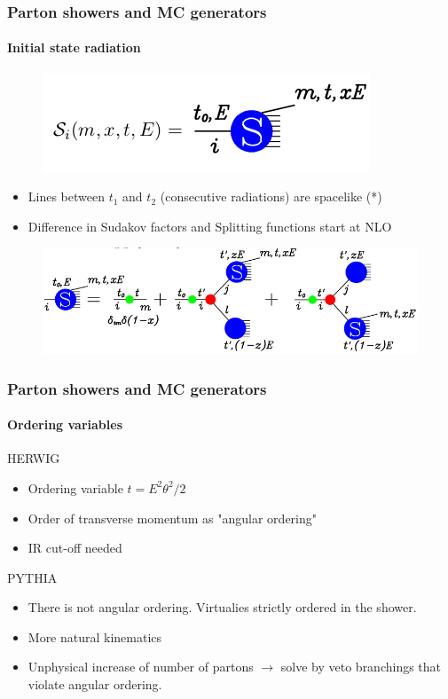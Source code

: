 \documentclass[aspectratio=43]{beamer}
\begin{document}
\begin{frame}

	\frametitle{Parton showers and MC generators}
	\framesubtitle{Initial state radiation}
	
	\begin{figure}
		\includegraphics[width = 5.5 cm]{plots/shower_ISR_2.png}
	\end{figure}
	
	\begin{itemize} 
		\item Lines between $t_{1}$ and $t_{2}$ (consecutive radiations) are spacelike {\color{blue}(*)}
		\item Difference in Sudakov factors and Splitting functions start at NLO
	\end{itemize}
	
	\begin{figure}
		\includegraphics[width = 10 cm]{plots/shower_ISR_3.png}
	\end{figure}

\end{frame}

\begin{frame}

	\frametitle{Parton showers and MC generators}
	\framesubtitle{Ordering variables}
	
	HERWIG
	\begin{itemize} 
		\item Ordering variable $t = E^{2}\theta^{2}/2$
		\item Order of transverse momentum as "angular ordering"
		\item IR cut-off needed
	\end{itemize}

	PYTHIA
	\begin{itemize} 
		\item There is not angular ordering. Virtualies strictly ordered in the shower.
		\item More natural kinematics
		\item Unphysical increase of number of partons $\longrightarrow$ solve by veto branchings that violate angular ordering.
	\end{itemize}

\end{frame}
\end{document}
